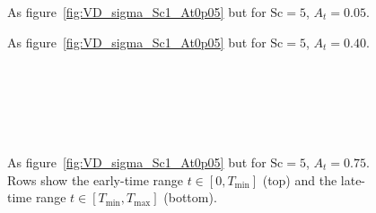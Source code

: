 
\clearpage
\begin{figure}[p]
  \centering
  \caption{As figure~\ref{fig:VD_sigma_Sc1_At0p05} but for $\mathrm{Sc}=5$, $A_t=0.05$.}
  \label{fig:VD_sigma_Sc5_At0p05}
\end{figure}

\begin{figure}[p]
  \centering
  \caption{As figure~\ref{fig:VD_sigma_Sc1_At0p05} but for $\mathrm{Sc}=5$, $A_t=0.40$.}
  \label{fig:VD_sigma_Sc5_At0p40}
\end{figure}

\begin{figure}[p]
  \centering
  \begin{minipage}[t]{0.32\linewidth}\centering
    \\[2pt]
    
  \end{minipage}\hfill
  \begin{minipage}[t]{0.32\linewidth}\centering
    \\[2pt]
    
  \end{minipage}\hfill
  \begin{minipage}[t]{0.32\linewidth}\centering
    \\[2pt]
    
  \end{minipage}
  \caption{As figure~\ref{fig:VD_sigma_Sc1_At0p05} but for $\mathrm{Sc}=5$, $A_t=0.75$.
           Rows show the early-time range $t\in[0,T_{\min}]$ (top) and the late-time range
           $t\in[T_{\min},T_{\max}]$ (bottom).}
  \label{fig:VD_sigma_Sc5_At0p75}
\end{figure}


